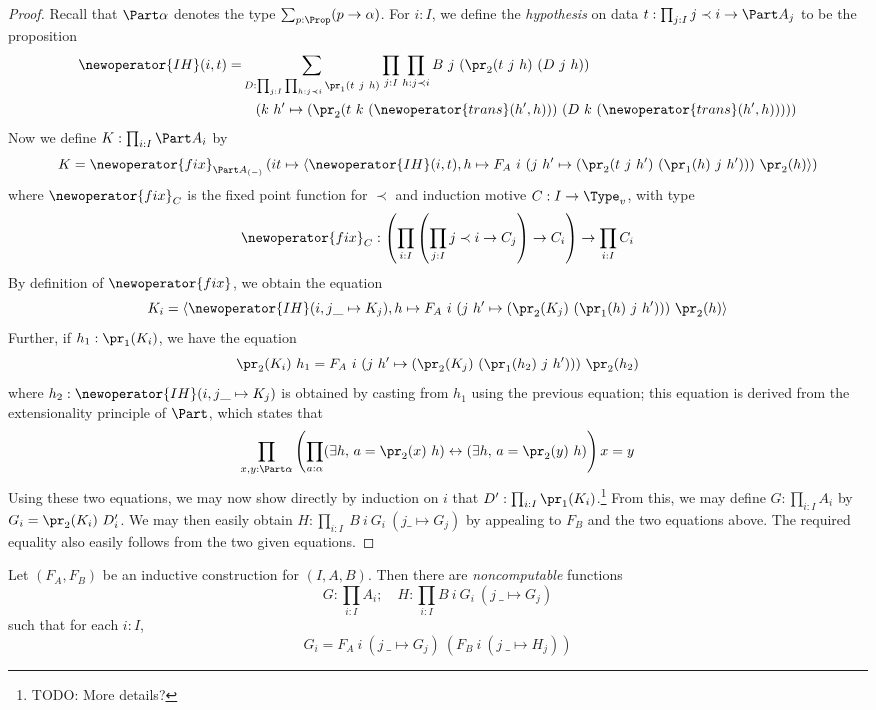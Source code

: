 \begin{proof}
  Recall that \( \Part \alpha \) denotes the type \( \sum_{p: \Prop} (p \to \alpha) \).
  For \( i : I \), we define the \emph{hypothesis} on data \( t : \prod_{j : I} j \prec i \to \Part A_j \) to be the proposition
  \begin{align*}
    \newoperator{IH}(i, t) = &\sum_{D : \prod_{j : I} \prod_{h : j \prec i} \pr_1(t\ j\ h)} \prod_{j : I} \prod_{h : j \prec i} B\ j\ (\pr_2(t\ j\ h)\ (D\ j\ h))\\
    &\quad(k\ h' \mapsto (\pr_2(t\ k\ (\newoperator{trans}(h',h)))\ (D\ k\ (\newoperator{trans}(h',h)))))
  \end{align*}
  Now we define \( K : \prod_{i : I} \Part A_i \) by
  \[ K = \newoperator{fix}_{\Part A_{(-)}} \left( i t \mapsto \left\langle \newoperator{IH}(i, t), h \mapsto F_A\ i\ (j\ h' \mapsto (\pr_2(t\ j\ h')\ (\pr_1(h)\ j\ h')))\ \pr_2(h) \right\rangle \right) \]
  where \( \newoperator{fix}_C \) is the fixed point function for \( \prec \) and induction motive \( C : I \to \Type_v \), with type
  \[ \newoperator{fix}_C : \left( \prod_{i : I} \left( \prod_{j : I} j \prec i \to C_j \right) \to C_i \right) \to \prod_{i : I} C_i \]
  By definition of \( \newoperator{fix} \), we obtain the equation
  \[ K_i = \left\langle \newoperator{IH}(i, j \_ \mapsto K_j), h \mapsto F_A\ i\ (j\ h' \mapsto (\pr_2(K_j)\ (\pr_1(h)\ j\ h')))\ \pr_2(h) \right\rangle \]
  Further, if \( h_1 : \pr_1(K_i) \), we have the equation
  \[ \pr_2(K_i)\ h_1 = F_A\ i\ (j\ h' \mapsto (\pr_2(K_j)\ (\pr_1(h_2)\ j\ h')))\ \pr_2(h_2) \]
  where \( h_2 : \newoperator{IH}(i, j \_ \mapsto K_j) \) is obtained by casting from \( h_1 \) using the previous equation; this equation is derived from the extensionality principle of \( \Part \), which states that
  \[ \prod_{x, y : \Part \alpha} \left( \prod_{a : \alpha} (\exists h,\, a = \pr_2(x)\ h) \leftrightarrow (\exists h,\, a = \pr_2(y)\ h) \right) x = y \]
  Using these two equations, we may now show directly by induction on \( i \) that \( D' : \prod_{i : I} \pr_1(K_i) \).\footnote{TODO: More details?}
  From this, we may define \( G : \prod_{i : I} A_i \) by \( G_i = \pr_2(K_i)\ D'_i \).
  We may then easily obtain \( H : \prod_{i : I}\ B\ i\ G_i\ (j \_ \mapsto G_j) \) by appealing to \( F_B \) and the two equations above.
  The required equality also easily follows from the two given equations.
\end{proof}
\begin{theorem}
  \label{prop:IC.fix}
  Let \( (F_A, F_B) \) be an inductive construction for \( (I, A, B) \).
  Then there are \emph{noncomputable} functions
  \[ G : \prod_{i : I} A_i;\quad H : \prod_{i : I} B\ i\ G_i\ (j\ \_ \mapsto G_j) \]
  such that for each \( i : I \),
  \[ G_i = F_A\ i\ (j\ \_ \mapsto G_j)\ (F_B\ i\ (j\ \_ \mapsto H_j)) \]
\end{theorem}
